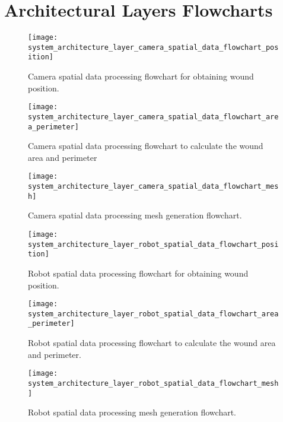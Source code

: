\chapter{Architectural Layers Flowcharts}
\label{app:architectural_layers_flowcharts}

\begin{figure}[htbp]
	\centering
	\texttt{[image: system\_architecture\_layer\_camera\_spatial\_data\_flowchart\_position]}
	\caption{Camera spatial data processing flowchart for obtaining wound position.}
	\label{fig:system_architecture_layer_camera_spatial_data_flowchart_position}
\end{figure}

\begin{figure}[htbp]
	\centering
	\texttt{[image: system\_architecture\_layer\_camera\_spatial\_data\_flowchart\_area\_perimeter]}
	\caption{Camera spatial data processing flowchart to calculate the wound area and perimeter}
	\label{fig:system_architecture_layer_camera_spatial_data_flowchart_area_perimeter}
\end{figure}

\begin{figure}[htbp]
	\centering
	\texttt{[image: system\_architecture\_layer\_camera\_spatial\_data\_flowchart\_mesh]}
	\caption{Camera spatial data processing mesh generation flowchart.}
	\label{fig:system_architecture_layer_camera_spatial_data_flowchart_mesh}
\end{figure}

\begin{figure}[htbp]
	\centering
	\texttt{[image: system\_architecture\_layer\_robot\_spatial\_data\_flowchart\_position]}
	\caption{Robot spatial data processing flowchart for obtaining wound position.}
	\label{fig:system_architecture_layer_robot_spatial_data_flowchart_position}
\end{figure}

\begin{figure}[htbp]
	\centering
	\texttt{[image: system\_architecture\_layer\_robot\_spatial\_data\_flowchart\_area\_perimeter]}
	\caption{Robot spatial data processing flowchart to calculate the wound area and perimeter.}
	\label{fig:system_architecture_layer_robot_spatial_data_flowchart_area_perimeter}
\end{figure}

\begin{figure}[htbp]
	\centering
	\texttt{[image: system\_architecture\_layer\_robot\_spatial\_data\_flowchart\_mesh]}
	\caption{Robot spatial data processing mesh generation flowchart.}
	\label{fig:system_architecture_layer_robot_spatial_data_flowchart_mesh}
\end{figure}